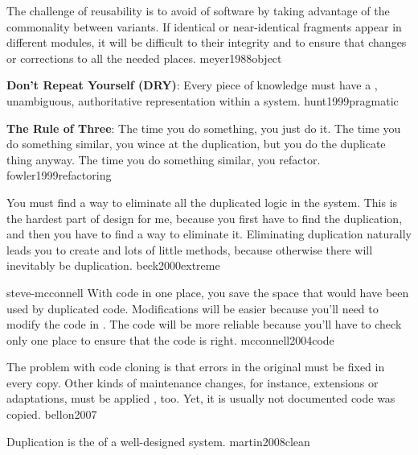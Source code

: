 \documentclass{article}
\begin{document}
  {The challenge of reusability is to avoid  of software by taking advantage of the commonality between variants. If identical or near-identical fragments appear in different modules, it will be difficult to  their integrity and to ensure that changes or corrections  to all the needed places.}
  {meyer1988object}

  {\textbf{Don't Repeat Yourself (DRY)}: Every piece of knowledge must have a , unambiguous, authoritative representation within a system.}
  {hunt1999pragmatic}

  {\textbf{The Rule of Three}: The  time you do something, you just do it. The  time you do something similar, you wince at the duplication, but you do the duplicate thing anyway. The  time you do something similar, you refactor.}
  {fowler1999refactoring}

  {You must find a way to eliminate all the duplicated logic in the system. This is the hardest part of design for me, because you first have to find the duplication, and then you have to find a way to eliminate it. Eliminating duplication naturally leads you to create  and lots of little methods, because otherwise there will inevitably be duplication.}
  {beck2000extreme}

\lnQuote
  {steve-mcconnell}
  {With code in one place, you save the space that would have been used by duplicated code. Modifications will be easier because you'll need to modify the code in . The code will be more reliable because you'll have to check only one place to ensure that the code is right.}
  {mcconnell2004code}

  {The problem with code cloning is that errors in the original must be fixed in every copy. Other kinds of maintenance changes, for instance, extensions or adaptations, must be applied , too. Yet, it is usually not documented  code was copied.}
  {bellon2007}

  {Duplication is the  of a well-designed system.}
  {martin2008clean}

\end{document}
